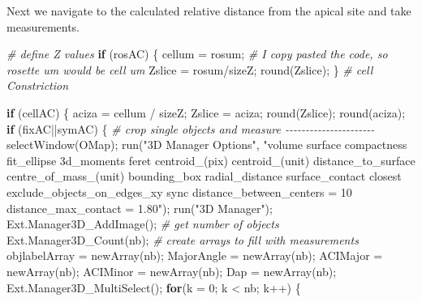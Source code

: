 \documentclass[10pt, b5paper, singlespacinge, twoside]{reedthesis} %
\newenvironment{Shaded}{}{}
\newcommand{\AttributeTok}[1]{#1}
\newcommand{\CommentTok}[1]{\textit{#1}}
\newcommand{\ControlFlowTok}[1]{\textbf{#1}}
\newcommand{\DecValTok}[1]{#1}
\newcommand{\FunctionTok}[1]{#1}
\newcommand{\NormalTok}[1]{#1}
\newcommand{\OtherTok}[1]{#1}
\newcommand{\SpecialCharTok}[1]{#1}
\newcommand{\StringTok}[1]{#1}
\theoremstyle{definition}
\theoremstyle{definition}
\theoremstyle{definition}
\theoremstyle{remark}
\begin{document}
Next we navigate to the calculated relative distance from the apical site and take measurements.

\scriptsize
\begin{Shaded}
\begin{Highlighting}[numbers=left,,]
\CommentTok{\# define Z values}
    \ControlFlowTok{if}\NormalTok{ (rosAC) \{}
\NormalTok{        cellum }\OtherTok{=}\NormalTok{ rosum; }\CommentTok{\# I copy pasted the code, so rosette um would be cell um}
\NormalTok{        Zslice }\OtherTok{=}\NormalTok{ rosum}\SpecialCharTok{/}\NormalTok{sizeZ;}
        \FunctionTok{round}\NormalTok{(Zslice);}
\NormalTok{    \}}
\CommentTok{\# cell Constriction}

    \ControlFlowTok{if}\NormalTok{ (cellAC) \{}
\NormalTok{        aciza }\OtherTok{=}\NormalTok{ cellum }\SpecialCharTok{/}\NormalTok{ sizeZ;}
\NormalTok{        Zslice }\OtherTok{=}\NormalTok{ aciza;}
        \FunctionTok{round}\NormalTok{(Zslice);}
        \FunctionTok{round}\NormalTok{(aciza);}
        \ControlFlowTok{if}\NormalTok{ (fixAC}\SpecialCharTok{||}\NormalTok{symAC) \{}
    \CommentTok{\# crop single objects and measure {-}{-}{-}{-}{-}{-}{-}{-}{-}{-}{-}{-}{-}{-}{-}{-}{-}{-}{-}{-}{-}{-}}
      \FunctionTok{selectWindow}\NormalTok{(OMap);}
        \FunctionTok{run}\NormalTok{(}\StringTok{"3D Manager Options"}\NormalTok{, }\StringTok{"volume surface compactness fit\_ellipse 3d\_moments }
\StringTok{        feret centroid\_(pix) centroid\_(unit) distance\_to\_surface centre\_of\_mass\_(unit) }
\StringTok{        bounding\_box radial\_distance surface\_contact closest exclude\_objects\_on\_edges\_xy }
\StringTok{        sync distance\_between\_centers = 10 distance\_max\_contact = 1.80"}\NormalTok{);}
        \FunctionTok{run}\NormalTok{(}\StringTok{"3D Manager"}\NormalTok{);}
        \FunctionTok{Ext.Manager3D\_AddImage}\NormalTok{();}
    \CommentTok{\# get number of objects}
        \FunctionTok{Ext.Manager3D\_Count}\NormalTok{(nb);}
    \CommentTok{\# create arrays to fill with measurements}
\NormalTok{        objlabelArray }\OtherTok{=} \FunctionTok{newArray}\NormalTok{(nb);}
\NormalTok{        MajorAngle }\OtherTok{=} \FunctionTok{newArray}\NormalTok{(nb);}
\NormalTok{        ACIMajor }\OtherTok{=} \FunctionTok{newArray}\NormalTok{(nb);}
\NormalTok{        ACIMinor }\OtherTok{=} \FunctionTok{newArray}\NormalTok{(nb);}
\NormalTok{        Dap }\OtherTok{=} \FunctionTok{newArray}\NormalTok{(nb);}
        \FunctionTok{Ext.Manager3D\_MultiSelect}\NormalTok{();}
        \ControlFlowTok{for}\NormalTok{(}\AttributeTok{k =} \DecValTok{0}\NormalTok{; k }\SpecialCharTok{\textless{}}\NormalTok{ nb; k}\SpecialCharTok{++}\NormalTok{) \{}

\end{Highlighting}
\end{Shaded}
\end{document}
